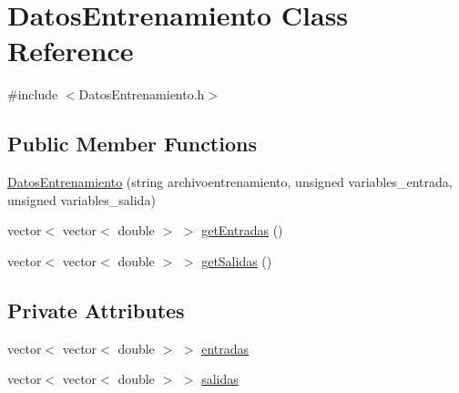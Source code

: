 \hypertarget{classDatosEntrenamiento}{\section{Datos\-Entrenamiento Class Reference}
\label{classDatosEntrenamiento}
}


{\ttfamily \#include $<$Datos\-Entrenamiento.\-h$>$}

\subsection*{Public Member Functions}
\begin{DoxyCompactItemize}
\item 
\hyperlink{classDatosEntrenamiento_ab5a8f5a72a62af6f815cd66f15d161d8}{Datos\-Entrenamiento} (string archivoentrenamiento, unsigned variables\-\_\-entrada, unsigned variables\-\_\-salida)
\item 
vector$<$ vector$<$ double $>$ $>$ \hyperlink{classDatosEntrenamiento_a09eede6dc8281b0da36f576b105c1c19}{get\-Entradas} ()
\item 
vector$<$ vector$<$ double $>$ $>$ \hyperlink{classDatosEntrenamiento_a711631dcea52cb8d8f6faa5bc5c11c69}{get\-Salidas} ()
\end{DoxyCompactItemize}
\subsection*{Private Attributes}
\begin{DoxyCompactItemize}
\item 
vector$<$ vector$<$ double $>$ $>$ \hyperlink{classDatosEntrenamiento_abefc5a5c4c2cdc1b53d1a4cc2a748d32}{entradas}
\item 
vector$<$ vector$<$ double $>$ $>$ \hyperlink{classDatosEntrenamiento_ac262fa4f8738dfa4487efe69cce601be}{salidas}
\end{DoxyCompactItemize}


